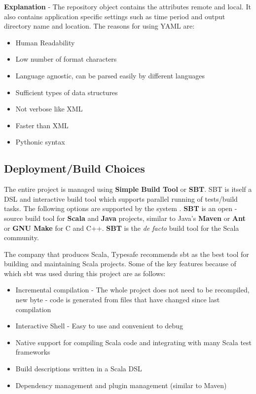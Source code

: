 \noindent
\textbf{Explanation} - The repository object contains the attributes remote and local. It also contains application specific settings such as time period and output directory name and location. The reasons for using YAML are:
\begin{itemize}
\item Human Readability
\item Low number of format characters
\item Language agnostic, can be parsed easily by different languages
\item Sufficient types of data structures
\item Not verbose like XML
\item Faster than XML
\item Pythonic syntax
\end{itemize}

\subsection{Deployment/Build Choices}
The entire project is managed using \textbf{Simple Build Tool} or \textbf{SBT}. SBT is itself a DSL and interactive build tool which supports parallel running of tests/build tasks. The following options are supported by the system \cite{sbt}. \textbf{SBT} is an open - source build tool for \textbf{Scala} and \textbf{Java} projects, similar to Java's \textbf{Maven }or \textbf{Ant} or \textbf{GNU Make} for C and C++. \textbf{SBT} is the \textit{de facto} build tool for the Scala community.
\bigskip

\noindent
The company that produces Scala, Typesafe recommends sbt as the best tool for building and maintaining Scala projects. Some of the key features because of which sbt was used during this project are as follows:
\begin{itemize}
\item Incremental compilation - The whole project does not need to be recompiled, new byte - code is generated from files that have changed since last compilation
\item Interactive Shell - Easy to use and convenient to debug
\item Native support for compiling Scala code and integrating with many Scala test frameworks
\item Build descriptions written in a Scala DSL\cite{sbt}
\item Dependency management and plugin management (similar to Maven)
\end{itemize}
 
